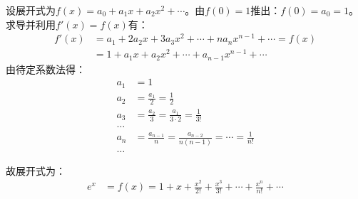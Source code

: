 \documentclass[b5paper]{ctexart}
\begin{document}
\begin{Answer}[ref={ex:complex}]
{\vspace{2mm}
设展开式为$f(x) = a_0 + a_1 x + a_2 x^2 + \dotsb$。由$f(0) = 1$推出：$f(0) = a_0 = 1$。求导并利用$f'(x) = f(x)$有：
\begin{align*}
f'(x) &= a_1 + 2a_2x + 3a_3x^2 + \dotsb + na_nx^{n-1} + \dotsb = f(x) \\
      &= 1 + a_1x + a_2x^2 + \dotsb + a_{n-1}x^{n-1} + \dotsb
\end{align*}
由待定系数法得：
\begin{align*}
a_1 &= 1\\
a_2 &= \frac{a_1}{2} = \frac{1}{2}\\
a_3 &= \frac{a_2}{3} = \frac{a_1}{3 \cdot 2} = \frac{1}{3!}\\
\dotso\\
a_n &= \frac{a_{n-1}}{n} = \frac{a_{n-2}}{n(n-1)} = \dotsb = \frac{1}{n!} \\
\dotso
\end{align*}

故展开式为：
\begin{align*}
e^x &= f(x) = 1 + x + \frac{x^2}{2!} + \frac{x^3}{3!} + \dotsb + \frac{x^n}{n!} + \dotsb
\end{align*}
}



\end{Answer}
\end{document}
